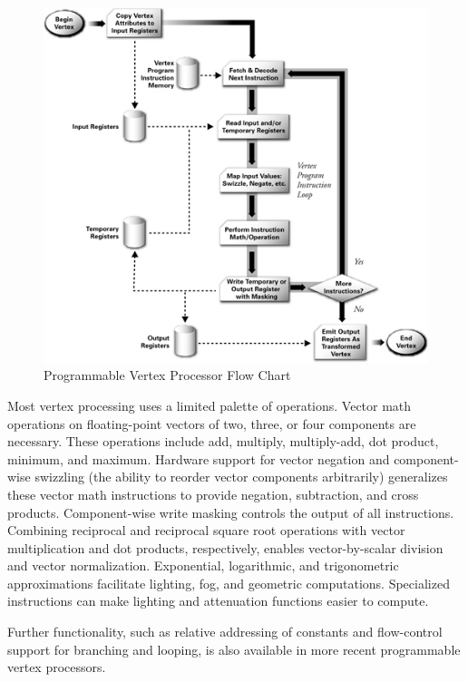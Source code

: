 \documentclass{book}
\begin{document}
\begin{figure}
    \centering
    \includegraphics[width=1\linewidth]{Images/fig1_8.jpg}
    \caption{Programmable Vertex Processor Flow Chart}
    \label{fig:1-8}
\end{figure}

Most vertex processing uses a limited palette of operations. Vector math operations on floating-point vectors of two, three, or four components are necessary. These operations include add, multiply, multiply-add, dot product, minimum, and maximum. Hardware support for vector negation and component-wise swizzling (the ability to reorder vector components arbitrarily) generalizes these vector math instructions to provide negation, subtraction, and cross products. Component-wise write masking controls the output of all instructions. Combining reciprocal and reciprocal square root operations with vector multiplication and dot products, respectively, enables vector-by-scalar division and vector normalization. Exponential, logarithmic, and trigonometric approximations facilitate lighting, fog, and geometric computations. Specialized instructions can make lighting and attenuation functions easier to compute.

Further functionality, such as relative addressing of constants and flow-control support for branching and looping, is also available in more recent programmable vertex processors.
\end{document}
